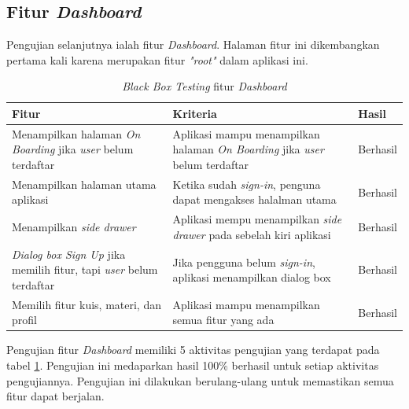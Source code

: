 \subsection{Fitur \textit{Dashboard}}
Pengujian selanjutnya ialah fitur \textit{Dashboard}. Halaman fitur ini dikembangkan pertama kali karena merupakan fitur \textit{"root"} dalam aplikasi ini.
\begin{table}[H]
	\centering
	\caption{\textit{Black Box Testing} fitur \textit{Dashboard}}
	\label{Tab:blackBoxDash}
	\begin{tabular}{|p{}|p{}|p{}|}
		\hline
		 \centering\textbf{Fitur} & \multicolumn{1}{m{0.45\textwidth}|}{\centering \textbf{Kriteria}}&  \multicolumn{1}{m{0.1\textwidth}|}{\centering \textbf{Hasil}}\\
		\hline
		Menampilkan halaman \textit{On Boarding} jika \textit{user} belum terdaftar 
		& Aplikasi mampu menampilkan halaman \textit{On Boarding} jika \textit{user} belum terdaftar  
		& Berhasil\\
		\hline
		Menampilkan halaman utama aplikasi
		& Ketika sudah \textit{sign-in}, penguna dapat mengakses halalman utama 
		& Berhasil\\
		\hline
		Menampilkan \textit{side drawer}
		& Aplikasi mempu menampilkan \textit{side drawer} pada sebelah kiri aplikasi
		& Berhasil\\
		\hline
		\textit{Dialog box Sign Up} jika memilih fitur, tapi \textit{user} belum terdaftar
		& Jika pengguna belum \textit{sign-in}, aplikasi menampilkan dialog box 
		& Berhasil\\
		\hline
		Memilih fitur kuis, materi, dan profil
		& Aplikasi mampu menampilkan semua fitur yang ada
		& Berhasil\\
		\hline
	\end{tabular}
\end{table}
Pengujian fitur \textit{Dashboard} memiliki 5 aktivitas pengujian yang terdapat pada tabel \ref*{Tab:blackBoxDash}.
Pengujian ini medaparkan hasil 100\% berhasil untuk setiap aktivitas pengujiannya. Pengujian ini dilakukan berulang-ulang untuk memastikan semua fitur dapat berjalan.
\newpage

